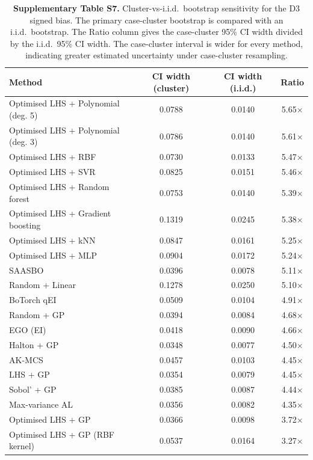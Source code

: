 \begin{table}[htbp]
\centering
\caption{\textbf{Supplementary Table S7.} Cluster-vs-i.i.d.\ bootstrap sensitivity for the D3 signed bias. The primary case-cluster bootstrap is compared with an i.i.d.\ bootstrap. The Ratio column gives the case-cluster 95\% CI width divided by the i.i.d.\ 95\% CI width. The case-cluster interval is wider for every method, indicating greater estimated uncertainty under case-cluster resampling.}
\label{tab:si_d3_ci_sensitivity}
\SITableFont
\setlength{\tabcolsep}{5pt}
\begin{tabular}{@{}lccc@{}}
\toprule
\textbf{Method} & \textbf{CI width (cluster)} & \textbf{CI width (i.i.d.)} & \textbf{Ratio} \\
\midrule
Optimised LHS + Polynomial (deg. 5) & 0.0788 & 0.0140 & 5.65$\times$ \\
Optimised LHS + Polynomial (deg. 3) & 0.0786 & 0.0140 & 5.61$\times$ \\
Optimised LHS + RBF & 0.0730 & 0.0133 & 5.47$\times$ \\
Optimised LHS + SVR & 0.0825 & 0.0151 & 5.46$\times$ \\
Optimised LHS + Random forest & 0.0753 & 0.0140 & 5.39$\times$ \\
Optimised LHS + Gradient boosting & 0.1319 & 0.0245 & 5.38$\times$ \\
Optimised LHS + kNN & 0.0847 & 0.0161 & 5.25$\times$ \\
Optimised LHS + MLP & 0.0904 & 0.0172 & 5.24$\times$ \\
SAASBO & 0.0396 & 0.0078 & 5.11$\times$ \\
Random + Linear & 0.1278 & 0.0250 & 5.10$\times$ \\
BoTorch qEI & 0.0509 & 0.0104 & 4.91$\times$ \\
Random + GP & 0.0394 & 0.0084 & 4.68$\times$ \\
EGO (EI) & 0.0418 & 0.0090 & 4.66$\times$ \\
Halton + GP & 0.0348 & 0.0077 & 4.50$\times$ \\
AK-MCS & 0.0457 & 0.0103 & 4.45$\times$ \\
LHS + GP & 0.0354 & 0.0079 & 4.45$\times$ \\
Sobol' + GP & 0.0385 & 0.0087 & 4.44$\times$ \\
Max-variance AL & 0.0356 & 0.0082 & 4.35$\times$ \\
Optimised LHS + GP & 0.0366 & 0.0098 & 3.72$\times$ \\
Optimised LHS + GP (RBF kernel) & 0.0537 & 0.0164 & 3.27$\times$ \\
\bottomrule
\end{tabular}
\end{table}
